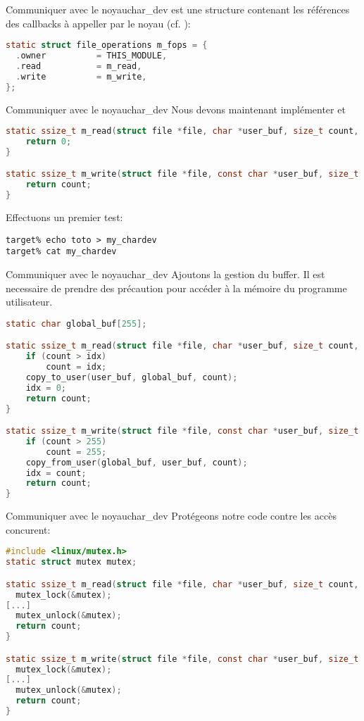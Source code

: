 \begin{frame}[fragile=singleslide]{Communiquer avec le noyau}{char\_dev}
   est une structure contenant les références des callbacks à appeller par le noyau (cf. ):
  \begin{lstlisting}[language=c]
static struct file_operations m_fops = {
  .owner          = THIS_MODULE,
  .read           = m_read,
  .write          = m_write,
};
  \end{lstlisting}
\end{frame}

\begin{frame}[fragile=singleslide]{Communiquer avec le noyau}{char\_dev}
Nous devons maintenant implémenter  et 
  \begin{lstlisting}[language=c]
static ssize_t m_read(struct file *file, char *user_buf, size_t count, loff_t *ppos) {
    return 0;
}

static ssize_t m_write(struct file *file, const char *user_buf, size_t count, loff_t *ppos) {
    return count;
}
  \end{lstlisting}
Effectuons un premier test:
  \begin{lstlisting}
target% echo toto > my_chardev
target% cat my_chardev
  \end{lstlisting}
\end{frame}

\begin{frame}[fragile=singleslide]{Communiquer avec le noyau}{char\_dev}
Ajoutons la gestion du buffer. Il est necessaire de prendre des précaution pour 
accéder à la mémoire du programme utilisateur.
  \begin{lstlisting}[language=c]
static char global_buf[255];

static ssize_t m_read(struct file *file, char *user_buf, size_t count, loff_t *ppos) {
    if (count > idx)
        count = idx;
    copy_to_user(user_buf, global_buf, count);
    idx = 0;
    return count;
}

static ssize_t m_write(struct file *file, const char *user_buf, size_t count, loff_t *ppos) {
    if (count > 255)
        count = 255;
    copy_from_user(global_buf, user_buf, count);
    idx = count;
    return count;
}
  \end{lstlisting}
\end{frame}

\begin{frame}[fragile=singleslide]{Communiquer avec le noyau}{char\_dev}
Protégeons notre code contre les accès concurent:
  \begin{lstlisting}[language=c]
#include <linux/mutex.h>
static struct mutex mutex;

static ssize_t m_read(struct file *file, char *user_buf, size_t count, loff_t *ppos) {
  mutex_lock(&mutex);
[...]
  mutex_unlock(&mutex);
  return count;
}

static ssize_t m_write(struct file *file, const char *user_buf, size_t count, loff_t *ppos) {
  mutex_lock(&mutex);
[...]
  mutex_unlock(&mutex);
  return count;
}
  \end{lstlisting}
\end{frame}

